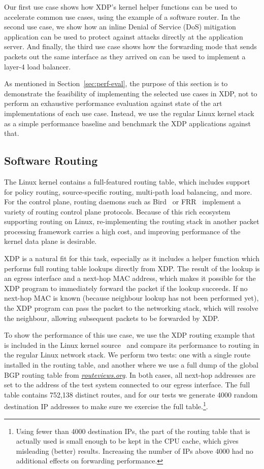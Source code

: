 \documentclass[sigconf]{acmart}
\begin{document}
Our first use case shows how XDP's kernel helper functions can be used to
accelerate common use cases, using the example of a software router. In the
second use case, we show how an inline Denial of Service (DoS) mitigation
application can be used to protect against attacks directly at the application
server. And finally, the third use case shows how the forwarding mode that sends
packets out the same interface as they arrived on can be used to implement a
layer-4 load balancer.

As mentioned in Section~\ref{sec:perf-eval}, the purpose of this section is to
demonstrate the feasibility of implementing the selected use cases in XDP, not
to perform an exhaustive performance evaluation against state of the art
implementations of each use case. Instead, we use the regular Linux kernel stack
as a simple performance baseline and benchmark the XDP applications against
that.

\subsection{Software Routing}
\label{sec:fwd-usecase}
The Linux kernel contains a full-featured routing table, which includes support
for policy routing, source-specific routing, multi-path load balancing, and more.
For the control plane, routing daemons such as Bird~\cite{bird} or
FRR~\cite{frr} implement a variety of routing control plane protocols. Because
of this rich ecosystem supporting routing on Linux, re-implementing the routing
stack in another packet processing framework carries a high cost, and improving
performance of the kernel data plane is desirable.

XDP is a natural fit for this task, especially as it includes a helper function
which performs full routing table lookups directly from XDP. The result of the
lookup is an egress interface and a next-hop MAC address, which makes it
possible for the XDP program to immediately forward the packet if the lookup
succeeds. If no next-hop MAC is known (because neighbour lookup has not been
performed yet), the XDP program can pass the packet to the networking stack,
which will resolve the neighbour, allowing subsequent packets to be forwarded by
XDP.

To show the performance of this use case, we use the XDP routing example that is
included in the Linux kernel source~\cite{fwd-example} and compare its
performance to routing in the regular Linux network stack. We perform two tests:
one with a single route installed in the routing table, and another where we use
a full dump of the global BGP routing table from \emph{\url{routeviews.org}}. In
both cases, all next-hop addresses are set to the address of the test system
connected to our egress interface. The full table contains 752,138 distinct
routes, and for our tests we generate 4000 random destination IP addresses to
make sure we exercise the full table.\footnote{Using fewer than 4000 destination
  IPs, the part of the routing table that is actually used is small enough to be
  kept in the CPU cache, which gives misleading (better) results. Increasing the
  number of IPs above 4000 had no additional effects on forwarding
  performance.}.
\end{document}
